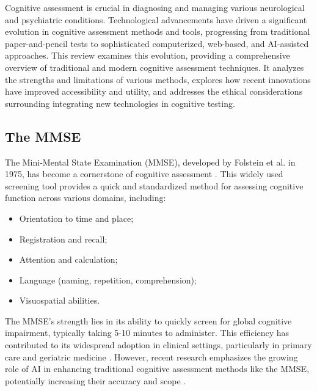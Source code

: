 Cognitive assessment is crucial in diagnosing and managing various neurological and psychiatric conditions. Technological advancements have driven a significant evolution in cognitive assessment methods and tools, progressing from traditional paper-and-pencil tests to sophisticated computerized, web-based, and AI-assisted approaches. This review examines this evolution, providing a comprehensive overview of traditional and modern cognitive assessment techniques. It analyzes the strengths and limitations of various methods, explores how recent innovations have improved accessibility and utility, and addresses the ethical considerations surrounding integrating new technologies in cognitive testing.

\subsection{The MMSE}
The Mini-Mental State Examination (MMSE), developed by Folstein et al. in 1975, has become a cornerstone of cognitive assessment \cite{Folstein1975}. This widely used screening tool provides a quick and standardized method for assessing cognitive function across various domains, including:
\begin{itemize}
    \item Orientation to time and place;
    \item Registration and recall;
    \item Attention and calculation;
    \item Language (naming, repetition, comprehension);
    \item Visuospatial abilities.
\end{itemize}

The MMSE's strength lies in its ability to quickly screen for global cognitive impairment, typically taking 5-10 minutes to administer. This efficiency has contributed to its widespread adoption in clinical settings, particularly in primary care and geriatric medicine \cite{Crum1993}. However, recent research emphasizes the growing role of AI in enhancing traditional cognitive assessment methods like the MMSE, potentially increasing their accuracy and scope \cite{Veneziani2024}.

